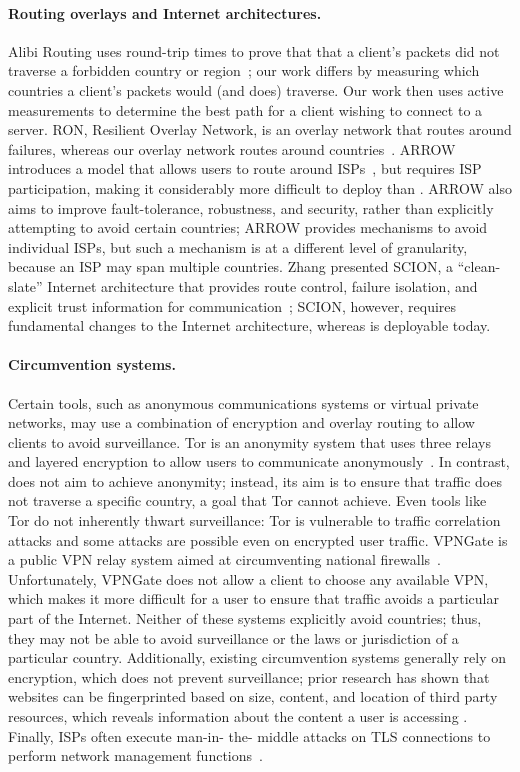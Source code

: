 \paragraph{Routing overlays and Internet architectures.} Alibi Routing uses
round-trip times to prove that that a client's packets did  not traverse a
forbidden country or region~\cite{levin2015alibi}; our work differs by
measuring  which countries a client's packets would (and does) traverse.  Our
work then  uses active measurements to determine the best path for a client
wishing  to connect to a server.  RON, Resilient Overlay Network, is an
overlay network that  routes around failures, whereas our overlay network
routes around countries~\cite{andersen2001resilient}.  ARROW introduces a
model that allows users to route around ISPs~\cite{peter2015one}, but requires
ISP participation, making it considerably more difficult to deploy than
\system{}. ARROW also aims to improve fault-tolerance, robustness, and
security, rather than explicitly attempting to avoid certain countries; ARROW
provides mechanisms to avoid individual ISPs, but such a mechanism is at a
different level of granularity, because an ISP may span multiple countries.
Zhang \ea presented SCION, a ``clean-slate'' Internet architecture that
provides route control, failure isolation, and explicit trust information for
communication~\cite{zhang2011scion}; SCION, however, requires fundamental
changes to the Internet architecture, whereas \system{} is deployable today.


\paragraph{Circumvention systems.}  Certain tools, such as anonymous
communications systems or virtual private networks, may use a combination of
encryption and overlay routing to allow clients to avoid surveillance. Tor is
an anonymity system that uses three relays and layered encryption to allow
users to communicate anonymously~\cite{dingledine2004tor}.  In contrast,
\system{} does not aim to achieve anonymity; instead, its aim is to ensure
that traffic does not traverse a specific  country, a goal that Tor cannot
achieve.  Even tools like Tor do not inherently thwart surveillance: Tor is
vulnerable to traffic correlation attacks and some attacks are possible even
on encrypted user traffic. VPNGate is a public VPN relay system aimed at
circumventing national firewalls~\cite{nobori2014vpn}. Unfortunately, VPNGate
does not allow a client to choose any available VPN, which makes it more
difficult for a user to ensure that traffic avoids a particular part of the
Internet.  Neither of these systems explicitly avoid countries; thus, they may
not  be able to avoid surveillance or the laws or jurisdiction of a particular
country. Additionally, existing circumvention systems generally rely on
encryption, which does not prevent surveillance; prior research has shown that
websites can be fingerprinted based on size, content, and location of third
party resources, which  reveals information about the content a user is
accessing \cite{what_isps_can_see}.  Finally, ISPs often execute man-in- the-
middle attacks on TLS connections to perform network management
functions~\cite{mitm_isp}.

